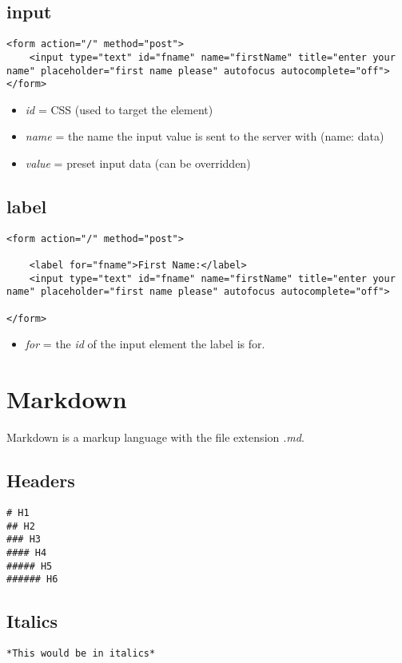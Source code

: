 \documentclass[]{article}
\newcommand{\<}{\guilsinglleft}
\renewcommand{\>}{\guilsinglright}
\renewcommand{\it}[1]{\textit{#1}}
\begin{document}
\subsection{\<input\>}
\begin{lstlisting}
<form action="/" method="post">
	<input type="text" id="fname" name="firstName" title="enter your name" placeholder="first name please" autofocus autocomplete="off">
</form>
\end{lstlisting}
\begin{itemize}
	\item \it{id} = CSS (used to target the element)
	\item \it{name} = the name the input value is sent to the server with (name: data)
	\item  \it{value} = preset input data (can be overridden)
\end{itemize}

\subsection{\<label\>}
\begin{lstlisting}
<form action="/" method="post">

	<label for="fname">First Name:</label>
	<input type="text" id="fname" name="firstName" title="enter your name" placeholder="first name please" autofocus autocomplete="off">

</form>
\end{lstlisting}
\begin{itemize}
	\item \it{for} = the \it{id} of the input element the label is for.
\end{itemize}

\section{Markdown}
Markdown is a markup language with the file extension \it{.md}.
\subsection{Headers}
\begin{lstlisting}
# H1
## H2
### H3
#### H4
##### H5
###### H6
\end{lstlisting}

\subsection{Italics}
\begin{lstlisting}
*This would be in italics*
\end{lstlisting}
\end{document}
